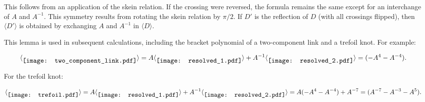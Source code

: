 \documentclass[11pt]{article}
\begin{document}
This follows from an application of the skein relation. If the crossing were reversed, the formula remains the same except for an interchange of \(A\) and \(A^{-1}\). This symmetry results from rotating the skein relation by \(\pi/2\). If \(D'\) is the reflection of \(D\) (with all crossings flipped), then \(\langle D' \rangle\) is obtained by exchanging \(A\) and \(A^{-1}\) in \(\langle D \rangle\).

This lemma is used in subsequent calculations, including the bracket polynomial of a two-component link and a trefoil knot. For example:

\begin{equation}
    \langle \raisebox{-0.15cm}{\texttt{[image: two\_component\_link.pdf]}} \rangle = A \langle \raisebox{-0.15cm}{\texttt{[image: resolved\_1.pdf]}} \rangle + A^{-1} \langle \raisebox{-0.15cm}{\texttt{[image: resolved\_2.pdf]}} \rangle = (-A^4 - A^{-4}).
\end{equation}

For the trefoil knot:

\begin{equation}
    \langle \raisebox{-0.15cm}{\texttt{[image: trefoil.pdf]}} \rangle = A \langle \raisebox{-0.15cm}{\texttt{[image: resolved\_1.pdf]}} \rangle + A^{-1} \langle \raisebox{-0.15cm}{\texttt{[image: resolved\_2.pdf]}} \rangle = A(-A^4 - A^{-4}) + A^{-7} = (A^{-7} - A^{-3} - A^5).
\end{equation}
\end{document}
